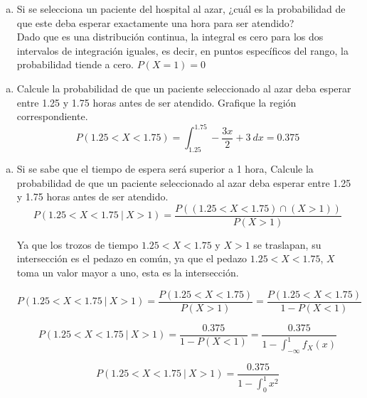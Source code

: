 \documentclass[11pt, spanish]{article}
\begin{document}
\begin{enumerate}[(d)]
\item Si se selecciona un paciente del hospital al azar, ¿cuál es la probabilidad de que este
deba esperar exactamente una hora para ser atendido?\\

Dado que es una distribución continua, la integral es cero para los dos intervalos de integración iguales, es decir, en puntos específicos del rango, la probabilidad tiende a cero. $P(X = 1) = 0$

\end{enumerate}
\begin{enumerate}[(e)]
\item Calcule la probabilidad de que un paciente seleccionado al azar deba esperar entre
1.25 y 1.75 horas antes de ser atendido. Grafique la región correspondiente.\\

$$P(1.25 < X < 1.75) = \int_{1.25}^{1.75} -\frac{3x}{2} + 3 \ dx = 0.375$$
\end{enumerate}

\begin{enumerate}[(f)]
\item Si se sabe que el tiempo de espera será superior a 1 hora, Calcule la probabilidad
de que un paciente seleccionado al azar deba esperar entre 1.25 y 1.75 horas antes de ser
atendido.\\

$$P(1.25 < X < 1.75 \ | \ X > 1) = \frac{P((1.25 < X < 1.75) \cap (X > 1))}{P(X > 1)}$$

Ya que los trozos de tiempo $1.25 < X < 1.75$ y $X > 1$ se traslapan, su intersección es el pedazo en común, ya que el pedazo $1.25 < X < 1.75$, $X$ toma un valor mayor a uno, esta es la intersección.

$$P(1.25 < X < 1.75 \ | \ X > 1) = \frac{P(1.25 < X < 1.75)}{P(X > 1)} = \frac{P(1.25 < X < 1.75)}{1 - P(X < 1)}$$

$$P(1.25 < X < 1.75 \ | \ X > 1) = \frac{0.375}{1 - P(X < 1)} = \frac{0.375}{1 - \int_{- \infty}^{1} f_X(x)}$$

$$P(1.25 < X < 1.75 \ | \ X > 1) = \frac{0.375}{1 - \int_{0}^{1} x^2}$$

\end{enumerate}
\end{document}
